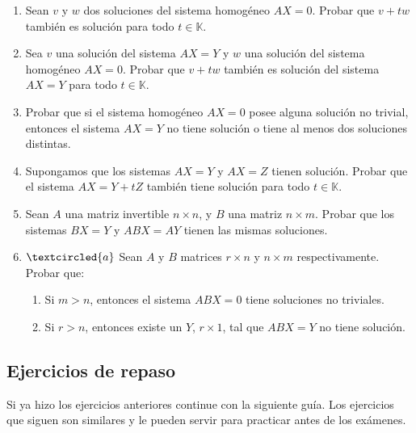 \begin{enumerate}[topsep=6pt,itemsep=.4cm]
\item\label{sol homog es subesp} Sean  $v$ y $w$ dos soluciones del sistema homog\'eneo $AX=0$. Probar que $v+tw$ tambi\'en es soluci\'on para todo $t\in\mathbb{K}$.

\item Sea $v$ una soluci\'on del sistema $AX=Y$ y $w$ una soluci\'on del sistema homog\'eneo $AX=0$. Probar que $v+tw$ tambi\'en es soluci\'on del sistema $AX=Y$ para todo $t\in\mathbb{K}$.

\item Probar que si el sistema homog\'eneo  $AX=0$ posee alguna soluci\'on no trivial, entonces el sistema $AX=Y$ no tiene
soluci\'on o tiene al menos dos soluciones distintas.

\item Supongamos que los sistemas $AX=Y$ y $AX=Z$ tienen soluci\'on. Probar que el sistema $AX=Y+tZ$ tambi\'en tiene soluci\'on para todo $t\in\mathbb{K}$.

\item Sean $A$ una matriz invertible $n\times n$, y $B$ una matriz $n\times m$.  Probar que los sistemas $BX=Y$ y $ABX=AY$ tienen las mismas soluciones.

\item\label{ej:sistemas ABX} $\textcircled{a}$
Sean $A$ y $B$ matrices $r\times n$ y $n\times m$ respectivamente.
Probar que:
\begin{enumerate}[topsep=5pt,itemsep=5pt]
    \item  Si $m>n$, entonces el sistema $ABX=0$ tiene soluciones no triviales.
    \item  Si $r>n$, entonces existe un $Y$, $r\times 1$, tal que $ABX=Y$
    no tiene soluci\'on.
\end{enumerate}


\end{enumerate}




\subsection*{Ejercicios de repaso}
Si ya hizo los ejercicios anteriores continue con la siguiente gu\'ia. Los ejercicios que siguen son similares y le pueden servir para practicar antes de los ex\'amenes.



